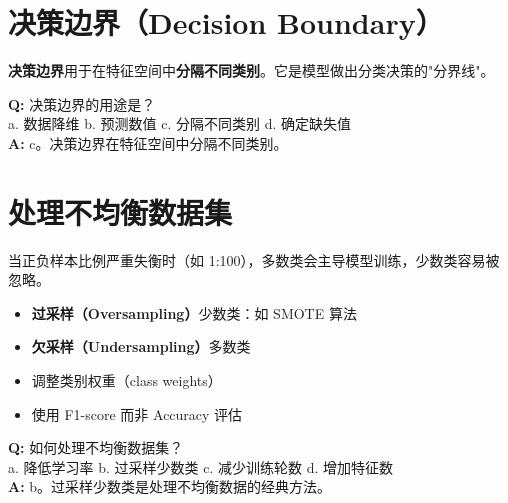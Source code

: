 \documentclass[11pt,a4paper]{article}
\begin{document}
\section{决策边界（Decision Boundary）}

\begin{bluebox}[决策边界的作用]
\textbf{决策边界}用于在特征空间中\textbf{分隔不同类别}。它是模型做出分类决策的"分界线"。
\end{bluebox}

\begin{examplebox}[例题：决策边界]
\textbf{Q:} 决策边界的用途是？\\
a. 数据降维 \quad b. 预测数值 \quad c. 分隔不同类别 \quad d. 确定缺失值\\
\textbf{A:} c。决策边界在特征空间中分隔不同类别。
\end{examplebox}

\section{处理不均衡数据集}

\begin{bluebox}[不均衡数据集的挑战]
当正负样本比例严重失衡时（如 1:100），多数类会主导模型训练，少数类容易被忽略。
\end{bluebox}

\begin{orangebox}[处理不均衡数据的方法]
\begin{itemize}
    \item \textbf{过采样（Oversampling）}少数类：如 SMOTE 算法
    \item \textbf{欠采样（Undersampling）}多数类
    \item 调整类别权重（class weights）
    \item 使用 F1-score 而非 Accuracy 评估
\end{itemize}
\end{orangebox}

\begin{examplebox}[例题：处理不均衡数据]
\textbf{Q:} 如何处理不均衡数据集？\\
a. 降低学习率 \quad b. 过采样少数类 \quad c. 减少训练轮数 \quad d. 增加特征数\\
\textbf{A:} b。过采样少数类是处理不均衡数据的经典方法。
\end{examplebox}
\end{document}
